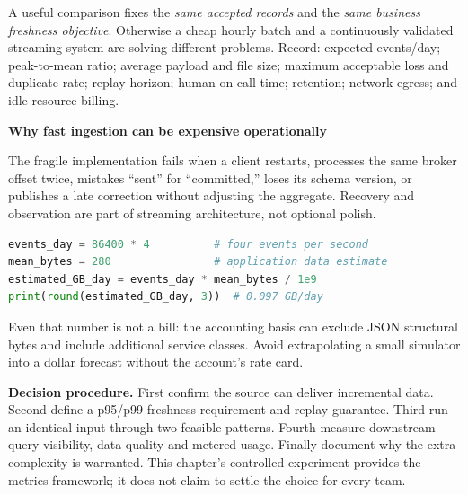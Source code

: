 \documentclass[11pt,twoside]{article}
\begin{document}
A useful comparison fixes the \emph{same accepted records} and the \emph{same business freshness objective}. Otherwise a cheap hourly batch and a continuously validated streaming system are solving different problems. Record: expected events/day; peak-to-mean ratio; average payload and file size; maximum acceptable loss and duplicate rate; replay horizon; human on-call time; retention; network egress; and idle-resource billing.
\begin{whitebox}\textbf{Why fast ingestion can be expensive operationally}\par
The fragile implementation fails when a client restarts, processes the same broker offset twice, mistakes ``sent'' for ``committed,'' loses its schema version, or publishes a late correction without adjusting the aggregate. Recovery and observation are part of streaming architecture, not optional polish.\end{whitebox}
\begin{lstlisting}[language=Python,caption={Design-time arithmetic; illustrative numbers, not vendor prices.}]
events_day = 86400 * 4          # four events per second
mean_bytes = 280                # application data estimate
estimated_GB_day = events_day * mean_bytes / 1e9
print(round(estimated_GB_day, 3))  # 0.097 GB/day
\end{lstlisting}
Even that number is not a bill: the accounting basis can exclude JSON structural bytes and include additional service classes. Avoid extrapolating a small simulator into a dollar forecast without the account's rate card.

\textbf{Decision procedure.} First confirm the source can deliver incremental data. Second define a p95/p99 freshness requirement and replay guarantee. Third run an identical input through two feasible patterns. Fourth measure downstream query visibility, data quality and metered usage. Finally document why the extra complexity is warranted. This chapter's controlled experiment provides the metrics framework; it does not claim to settle the choice for every team.
\newpage
\end{document}
